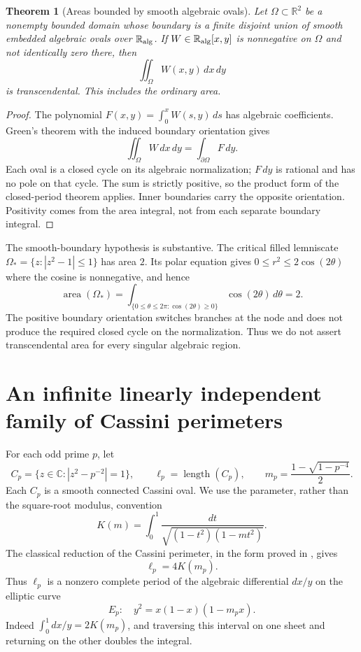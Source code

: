 \documentclass[11pt,a4paper]{article}
\newtheorem{theorem}{Theorem}[section]
\theoremstyle{definition}
\theoremstyle{remark}
\numberwithin{equation}{section}
\begin{document}
\begin{theorem}[Areas bounded by smooth algebraic ovals]\label{lm-area}
Let $\Omega\subset\mathbb R^2$ be a nonempty bounded domain whose boundary
is a finite disjoint union of smooth embedded algebraic ovals over
$\mathbb R_{\rm alg}$.  If $W\in\mathbb R_{\rm alg}[x,y]$ is
nonnegative on $\Omega$ and not identically zero there, then
\[
 \iint_\Omega W(x,y)\,dx\,dy
\]
is transcendental.  This includes the ordinary area.
\end{theorem}

\begin{proof}
The polynomial $F(x,y)=\int_0^xW(s,y)\,ds$ has algebraic coefficients.
Green's theorem with the induced boundary orientation gives
\[
 \iint_\Omega W\,dx\,dy=\int_{\partial\Omega}F\,dy.
\]
Each oval is a closed cycle on its algebraic normalization; $F\,dy$ is
rational and has no pole on that cycle.  The sum is strictly positive,
so the product form of the closed-period theorem applies.  Inner
boundaries carry the opposite orientation.  Positivity comes from the
area integral, not from each separate boundary integral.
\end{proof}

The smooth-boundary hypothesis is substantive.  The critical filled
lemniscate $\Omega_*=\{z:|z^2-1|\le1\}$ has area $2$.  Its polar
equation gives $0\le r^2\le2\cos(2\theta)$ where the cosine is
nonnegative, and hence
\[
 \operatorname{area}(\Omega_*)=
 \int_{\{0\le\theta\le2\pi:\cos(2\theta)\ge0\}}
          \cos(2\theta)\,d\theta=2.
\]
The positive boundary orientation switches branches at the node and
does not produce the required closed cycle on the normalization.  Thus
we do not assert transcendental area for every singular algebraic
region.

\section{An infinite linearly independent family of Cassini perimeters}
\label{lm-cassini-section}

For each odd prime $p$, let
\begin{equation}\label{lm-cassini-family}
 C_p=\{z\in\mathbb C:|z^2-p^{-2}|=1\},
 \qquad \ell_p=\operatorname{length}(C_p),
 \qquad m_p=\frac{1-\sqrt{1-p^{-4}}}{2}.
\end{equation}
Each $C_p$ is a smooth connected Cassini oval.  We use the parameter,
rather than the square-root modulus, convention
\[
 K(m)=\int_0^1\frac{dt}{\sqrt{(1-t^2)(1-mt^2)}}.
\]
The classical reduction of the Cassini perimeter, in the form proved in
\cite[Equation~(7.7.4)]{lm-Tamiozzo}, gives
\begin{equation}\label{lm-cassini-period}
 \ell_p=4K(m_p).
\end{equation}
Thus $\ell_p$ is a nonzero complete period of the algebraic differential
$dx/y$ on the elliptic curve
\begin{equation}\label{lm-elliptic-curve}
 E_p:\quad y^2=x(1-x)(1-m_px).
\end{equation}
Indeed $\int_0^1dx/y=2K(m_p)$, and traversing this interval on one sheet
and returning on the other doubles the integral.
\end{document}
